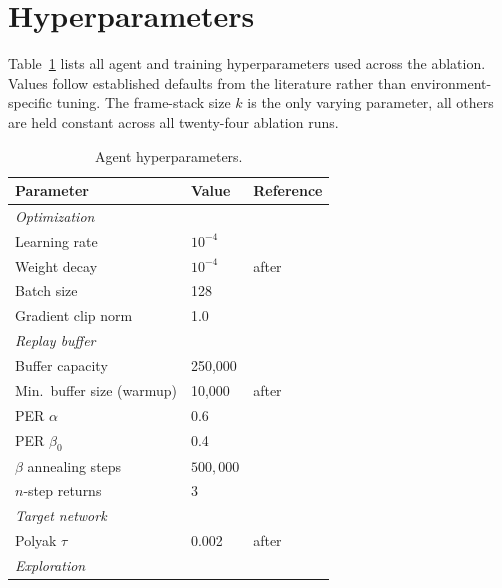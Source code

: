 \documentclass[12pt,a4paper,titlepage]{article}
\begin{document}
\newpage
\appendix

\section{Hyperparameters}
\label{app:hyperparams}

Table~\ref{tab:hyperparams} lists all agent and training hyperparameters used across the ablation. Values follow established defaults from the literature rather than environment-specific tuning. The frame-stack size $k$ is the only varying parameter, all others are held constant across all twenty-four ablation runs.

\begin{table}[!ht]
\centering
\caption{Agent hyperparameters.}
\label{tab:hyperparams}
\small
\begin{tabular}{lll}
\toprule
Parameter & Value & Reference \\
\midrule
\multicolumn{3}{l}{\textit{Optimization}} \\
Learning rate              & $10^{-4}$         & \\
Weight decay               & $10^{-4}$         & after \citet{Loshchilov2019} \\
Batch size                 & 128               & \\
Gradient clip norm         & 1.0               & \\
\midrule
\multicolumn{3}{l}{\textit{Replay buffer}} \\
Buffer capacity            & 250{,}000         & \\
Min.\ buffer size (warmup) & 10{,}000          & after \citet{Mnih2015} \\
PER $\alpha$               & 0.6               & \citet{Schaul2016} \\
PER $\beta_0$              & 0.4               & \citet{Schaul2016} \\
$\beta$ annealing steps    & $500{,}000$             & \\
$n$-step returns           & 3                 & \citet{Hessel2018} \\
\midrule
\multicolumn{3}{l}{\textit{Target network}} \\
Polyak $\tau$              & 0.002             & after \citet{Lillicrap2016} \\
\midrule
\multicolumn{3}{l}{\textit{Exploration}} \\

\end{tabular}
\end{table}
\end{document}
